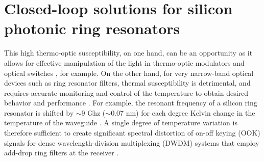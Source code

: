 
\pagestyle{plain}

\chapter[Closed-loop solutions for silicon photonic ring resonators][Top of Page Title]{Closed-loop solutions for silicon photonic ring resonators}

This high thermo-optic susceptibility, on one hand, can be an opportunity as it allows for effective manipulation of the light in thermo-optic modulators \cite{nedeljkovic2014mid,gautam2012single,wang2003soi} and optical switches \cite{suzuki2017broadband,li2016silicon,liu2016two}, for example. On the other hand, for very narrow-band optical devices such as ring resonator filters, thermal susceptibility is detrimental, and  requires  accurate monitoring and control of the temperature to obtain desired behavior and performance \cite{gazmanautomated,zortman2013bit,mahendra2017multiwavelength,padmaraju2014resolving,padmaraju2012thermal}. For example, the resonant frequency of a silicon ring resonator is shifted by $\sim$9 Ghz ($\sim$0.07 nm) for each degree Kelvin change in the temperature of the waveguide \cite{masood2013comparison,pintus2016optimization}. A single degree of temperature variation is therefore sufficient to create significant spectral distortion  of on-off keying (OOK) signals for dense wavelength-division multiplexing (DWDM) systems that employ add-drop ring filters at the receiver \cite{bahadori2016crosstalk,bahadori2016energy,sun2015single}. 

